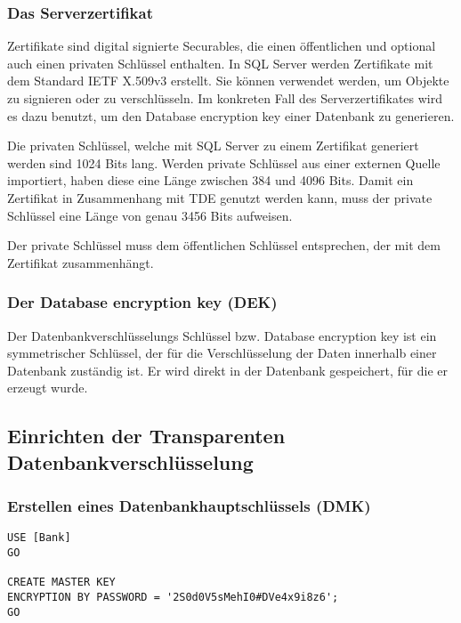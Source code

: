         \subsubsection{Das Serverzertifikat}
          Zertifikate sind digital signierte Securables, die einen öffentlichen
          und optional auch einen privaten Schlüssel enthalten. In SQL Server
          werden Zertifikate mit dem Standard IETF X.509v3 erstellt. Sie können
          verwendet werden, um Objekte zu signieren oder zu verschlüsseln. Im
          konkreten Fall des Serverzertifikates wird es dazu benutzt, um den
          Database encryption key einer Datenbank zu generieren.
          
          Die privaten Schlüssel, welche mit SQL Server zu einem Zertifikat
          generiert werden sind 1024 Bits lang. Werden private Schlüssel aus
          einer externen Quelle importiert, haben diese eine Länge zwischen 384
          und 4096 Bits. Damit ein Zertifikat in Zusammenhang mit TDE genutzt
          werden kann, muss der private Schlüssel eine Länge von genau 3456 Bits
          aufweisen.
          \begin{merke}
            Der private Schlüssel muss dem öffentlichen Schlüssel entsprechen,
            der mit dem Zertifikat zusammenhängt.
          \end{merke}
          \begin{literaturinternet}
            \item \cite{bb895327}
          \end{literaturinternet}
        \subsubsection{Der Database encryption key (DEK)}
          Der Datenbankverschlüsselungs Schlüssel bzw. Database encryption key
          ist ein symmetrischer Schlüssel, der für die Verschlüsselung der Daten
          innerhalb einer Datenbank zuständig ist. Er wird direkt in der
          Datenbank gespeichert, für die er erzeugt wurde.
      \subsection{Einrichten der Transparenten Datenbankverschlüsselung}
        \subsubsection{Erstellen eines Datenbankhauptschlüssels (DMK)}
          \begin{lstlisting}[language=ms_sql,caption={Erstellen eines
          Datenbankhauptschlüssels},label=sql19_26]
USE [Bank]
GO

CREATE MASTER KEY 
ENCRYPTION BY PASSWORD = '2S0d0V5sMehI0#DVe4x9i8z6';  
GO 
          \end{lstlisting}
          \begin{literaturinternet}
            \item \cite{aa337551}
            \item \cite{ms174382}
          \end{literaturinternet}
